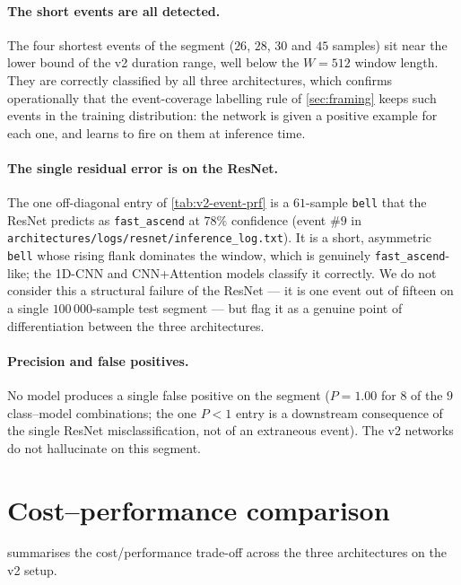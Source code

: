 \paragraph{The short events are all detected.} The four shortest
events of the segment ($26$, $28$, $30$ and $45$ samples) sit near
the lower bound of the v2 duration range, well below the $W = 512$
window length. They are correctly classified by all three
architectures, which confirms operationally that the event-coverage
labelling rule of \cref{sec:framing} keeps such events in the
training distribution: the network is given a positive example for
each one, and learns to fire on them at inference time.

\paragraph{The single residual error is on the ResNet.} The one
off-diagonal entry of \cref{tab:v2-event-prf} is a $61$-sample
\texttt{bell} that the ResNet predicts as \texttt{fast\_ascend} at
$78\%$ confidence (event $\#9$ in
\texttt{architectures/logs/resnet/inference\_log.txt}). It is a
short, asymmetric \texttt{bell} whose rising flank dominates the
window, which is genuinely \texttt{fast\_ascend}-like; the 1D-CNN and
CNN+Attention models classify it correctly. We do not consider this a
structural failure of the ResNet --- it is one event out of fifteen
on a single $100\,000$-sample test segment --- but flag it as a
genuine point of differentiation between the three architectures.

\paragraph{Precision and false positives.} No model produces a single
false positive on the segment ($P = 1.00$ for $8$ of the $9$
class--model combinations; the one $P < 1$ entry is a downstream
consequence of the single ResNet misclassification, not of an
extraneous event). The v2 networks do not hallucinate on this
segment.

\section{Cost--performance comparison}
\label{sec:res-cost}

 summarises the cost/performance trade-off across
the three architectures on the v2 setup.

